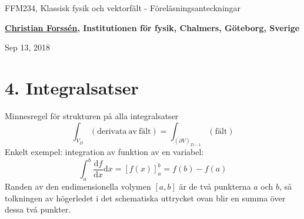 \documentclass[%
oneside,                 %
final,                   %
10pt]{article}
\begin{document}

\newcommand{\exercisesection}[1]{\subsection*{#1}}







\thispagestyle{empty}

\begin{center}
{\LARGE\bf
\begin{spacing}{1.25}
FFM234, Klassisk fysik och vektorfält - Föreläsningsanteckningar
\end{spacing}
}
\end{center}


\begin{center}
{\bf \href{{http://fy.chalmers.se/subatom/tsp/}}{Christian Forssén}, Institutionen för fysik, Chalmers, Göteborg, Sverige${}^{}$} \\ [0mm]
\end{center}

\begin{center}
\end{center}
    

\begin{center}
Sep 13, 2018
\end{center}

\vspace{1cm}


\section*{4. Integralsatser}

Minnesregel för strukturen på alla integralsatser
\begin{equation}
  \int_{V_D} (\mathrm{derivata~av~fält}) = \int_{(\partial V)_{D-1}} (\mathrm{fält})
\end{equation}
Enkelt exempel: integration av funktion av en variabel:
\begin{equation}
\int_a^b \frac{\mbox{d}f}{\mbox{d}x} \mbox{d}x = \left[ f(x) \right]_a^b = f(b)-f(a)
\end{equation}
Randen av den endimensionella volymen $[a,b]$ är de två punkterna $a$ och $b$, så tolkningen av högerledet i det schematiska uttrycket ovan blir en summa över dessa två punkter.
\end{document}
